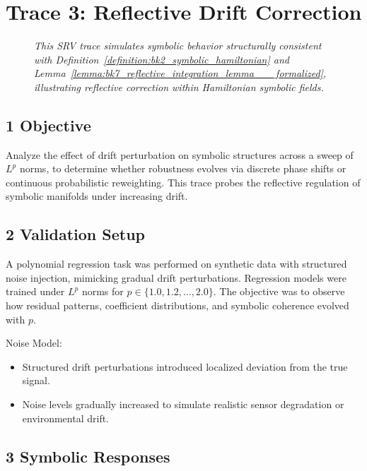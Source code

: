 \section*{Trace 3: Reflective Drift Correction}
\label{section:trace3_reflective_drift_correction}

\begin{figure}[htbp]
\centering
\caption[\textit{SRV trace (summary)}]{\textit{This SRV trace simulates symbolic behavior structurally consistent with Definition~\ref{definition:bk2_symbolic_hamiltonian} and Lemma~\ref{lemma:bk7_reflective_integration_lemma___formalized}, illustrating reflective correction within Hamiltonian symbolic fields.}}
\label{figure:trace3_reflective_drift_summary}
\end{figure}

\subsection*{1 Objective}
\label{subsection:trace3_objective}

Analyze the effect of drift perturbation on symbolic structures across a sweep of $L^p$ norms, to determine whether robustness evolves via discrete phase shifts or continuous probabilistic reweighting. This trace probes the reflective regulation of symbolic manifolds under increasing drift.

\subsection*{2 Validation Setup}
\label{subsection:trace3_validation_setup}

A polynomial regression task was performed on synthetic data with structured noise injection, mimicking gradual drift perturbations. Regression models were trained under $L^p$ norms for $p \in \{1.0, 1.2, \ldots, 2.0\}$. The objective was to observe how residual patterns, coefficient distributions, and symbolic coherence evolved with $p$.

Noise Model:
\begin{itemize}
    \item Structured drift perturbations introduced localized deviation from the true signal.
    \item Noise levels gradually increased to simulate realistic sensor degradation or environmental drift.
\end{itemize}

\subsection*{3 Symbolic Responses}
\label{subsection:trace3_symbolic_responses}

